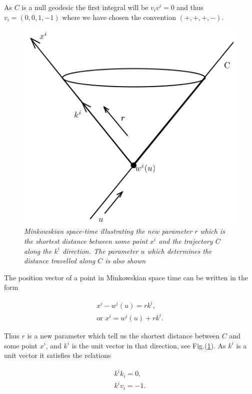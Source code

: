 \noindent As $C$ is a null geodesic the first integral will be $v_i v^i = 0$ and thus $v_i = (0,0,1,-1)$ where we have chosen the convention $(+,+,+,-)$. 

\begin{figure}[h!]
\begin{center}
\caption{\textit{Minkowskian space-time illustrating the new parameter $r$ which is the shortest distance between some point $x^i$ and the trajectory $C$ along the $k^i$ direction. The parameter $u$ which determines the distance travelled along $C$ is also shown}}
\label{Reparameterization_Figure_Unit_Vector}
\includegraphics[scale=0.8]{figs/2_1.png}
\end{center}
\end{figure}

The position vector of a point in Minkowskian space time can be written in the form

\begin{eqnarray*}
x^i - w^i (u) = r k^i, \\
\text{or } x^i = w^i(u) + r k^i. 
\end{eqnarray*}

\noindent Thus $r$ is a new parameter which tell us the shortest distance between $C$ and some point $x^i$, and $k^i$ is the unit vector in that direction, see Fig.(\ref{Reparameterization_Figure_Unit_Vector}). As $k^i$ is a unit vector it satisfies the relations

\begin{gather}
k^i k_i = 0 \label{k_rel_1},\\
k^i v_i = -1 \label{k_rel_2}.
\end{gather}

